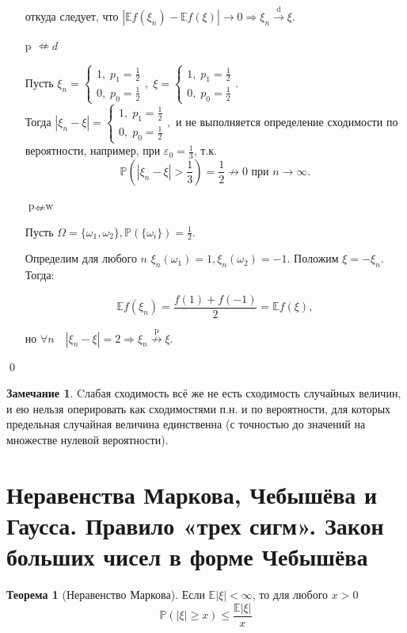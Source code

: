 \documentclass[oneside,final,14pt]{extreport}
\newcommand\myprob[1]{{\mathbb{P}(#1)}}
\renewenvironment{proof}{{\bfseries Доказательство.}}{\qed}
\theoremstyle{plain}
\theoremstyle{definition}
\newtheorem*{rmrk}{Замечание}
\theoremstyle{named}
\newtheorem*{namedthm}{Теорема}
\begin{document}
\begin{proof}
\begin{itemize}
    откуда следует, что $|\mathbb{E}f(\xi_n) - \mathbb{E}f(\xi)| \rightarrow 0 \Rightarrow \xi_n \xrightarrow[]{\text{d}} \xi$.
    
    \item[p $\nLeftarrow d$]
    
    Пусть $\xi_n = \begin{cases}
    1, \; p_1 = \frac{1}{2} \\
    0, \; p_0 = \frac{1}{2}
    \end{cases}, \; 
    \xi = \begin{cases}
    1, \; p_1 = \frac{1}{2} \\
    0, \; p_0 = \frac{1}{2}
    \end{cases}.$ \\
    Тогда $|\xi_n - \xi| = \begin{cases}
    1, \; p_1 = \frac{1}{2} \\
    0, \; p_0 = \frac{1}{2}
    \end{cases},$ \; и не выполняется определение сходимости по вероятности, например, при $\varepsilon_0 = \frac{1}{3}$, т.к. 
    $$ \mathbb{P}\left({|\xi_n - \xi| > \frac{1}{3}}\right) = \frac{1}{2} {\nrightarrow} 0 \text{ при } n \to \infty.
    $$
    
   \item[$\text{p} \nLeftarrow \text{w}$]
    
    Пусть $\Omega = \{\omega_1, \omega_2 \}, \mathbb{P}(\{\omega_i \}) = \frac{1}{2}.$ 
    
    Определим для любого $n$ $\xi_n(\omega_1) = 1, \xi_n(\omega_2) = -1.$ Положим $\xi = -\xi_n.$ Тогда:
    
    $$ \mathbb{E}f(\xi_n) = \frac{f(1) + f(-1)}{2} = \mathbb{E}f(\xi),$$
    
    но $\forall n \quad |\xi_n - \xi| = 2 \Rightarrow \xi_n \overset{\text{p}}{\nrightarrow} \xi.$
    
\end{itemize}    
\end{proof}

\begin{rmrk}
    Cлабая сходимость всё же не есть сходимость случайных величин, и ею нельзя оперировать как сходимостями п.н. и по вероятности, для которых предельная случайная величина единственна (с точностью до значений на множестве нулевой вероятности).
\end{rmrk}

\section{Неравенства Маркова, Чебышёва и Гаусса. Правило «трех сигм». Закон больших чисел в форме Чебышёва}
\begin{namedthm}[Неравенство Маркова]
    Если $\mathbb{E}|\xi| < \infty$, то для любого $x > 0$
    \begin{equation*}
        \myprob{|\xi| \geqslant x} \leqslant \frac{\mathbb{E}|\xi|}{x}
    \end{equation*}
\end{namedthm}
\end{document}
